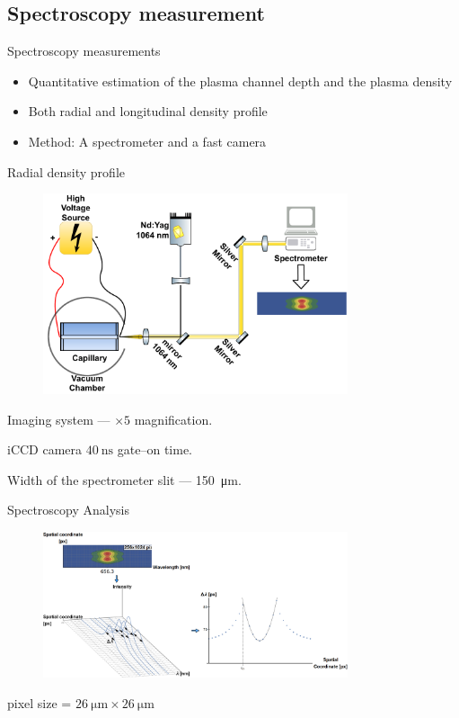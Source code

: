 \documentclass[dvipsnames]{beamer}
\begin{document}
\subsection{Spectroscopy measurement}
\begin{frame}{Spectroscopy measurements}
 \begin{itemize}
  \item Quantitative estimation of the plasma channel depth and the plasma density
  \item Both radial and longitudinal density profile
  \item Method: A spectrometer and a fast camera
 \end{itemize}
\end{frame}
\begin{frame}{Radial density profile}
 \begin{figure}
\includegraphics[width=0.8\textwidth]{figures/results/spectro/radial_system.pdf}
 \end{figure}
Imaging system --- $\times 5$ magnification.

iCCD camera $\SI{40}{\ns}$ gate--on time. 

Width of the spectrometer slit --- \SI{150}{\um}.
\end{frame}
\begin{frame}{Spectroscopy Analysis}
\begin{figure}
\includegraphics[width=0.8\textwidth]{figures/results/spectro/spectra_analysis.png}
 \end{figure}
 pixel size = $\SI{26}{\um} \times \SI{26}{\um}$
\end{frame}
\end{document}
